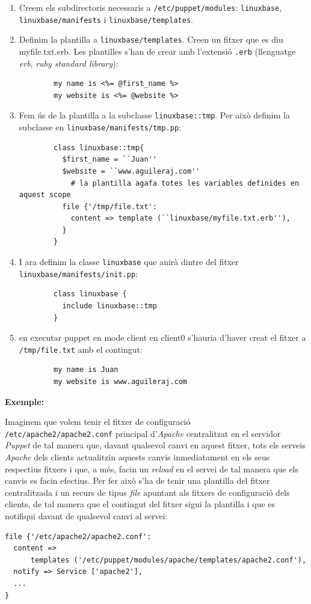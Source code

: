 \documentclass[a4paper]{article}
\begin{document}
\begin{enumerate}
	\item Creem els subdirectoris necessaris a \verb+/etc/puppet/modules+: \verb+linuxbase+, \verb+linuxbase/manifests+ i \verb+linuxbase/templates+.
	\item Definim la plantilla a \verb+linuxbase/templates+. Creen un fitxer que es diu myfile.txt.erb. Les plantilles s'han de crear amb l'extensió \verb+.erb+ (llenguatge \textit{erb}, \textit{ruby standard library}):
		\begin{verbatim}
		my name is <%= @first_name %>
		my website is <%= @website %>
		\end{verbatim}
	\item Fem ús de la plantilla a la subclasse \verb+linuxbase::tmp+. Per això definim la subclasse en \verb+linuxbase/manifests/tmp.pp+:
		\begin{verbatim}
		class linuxbase::tmp{
		  $first_name = ``Juan''
		  $website = ``www.aguileraj.com''
			# la plantilla agafa totes les variables definides en aquest scope
		  file {'/tmp/file.txt':
		    content => template (``linuxbase/myfile.txt.erb''),
		  }
		}
		\end{verbatim}
	\item I ara definim la classe \verb+linuxbase+ que anirà dintre del fitxer \verb+linuxbase/manifests/init.pp+:
		\begin{verbatim}
		class linuxbase {
		  include linuxbase::tmp
		}
		\end{verbatim}
	\item en executar puppet en mode client en client0 s'hauria d'haver creat el fitxer a \verb+/tmp/file.txt+ amb el contingut:
		\begin{verbatim}
		my name is Juan
		my website is www.aguileraj.com
		\end{verbatim}
\end{enumerate}
\textbf{Exemple:}

Imaginem que volem tenir el fitxer de configuració \\ \verb+/etc/apache2/apache2.conf+ principal d'\textit{Apache} centralitzat en el servidor \textit{Puppet} de tal manera que, davant qualsevol canvi en aquest fitxer, tots els serveis \textit{Apache} dels clients actualitzin aquests canvis inmediatament en els seus respectius fitxers i que, a m\'es, facin un \textit{reload} en el servei de tal manera que els canvis es facin efectius. Per fer això s'ha de tenir una plantilla del fitxer centralitzada i un recurs de tipus \textit{file} apuntant als fitxers de configuració dels clients, de tal manera que el contingut del fitxer sigui la plantilla i que es notifiqui davant de qualsevol canvi al servei:
\begin{verbatim} 
file {'/etc/apache2/apache2.conf':
  content => 
	  templates ('/etc/puppet/modules/apache/templates/apache2.conf'),
  notify => Service ['apache2'],
  ...
}
\end{verbatim}
\end{document}

